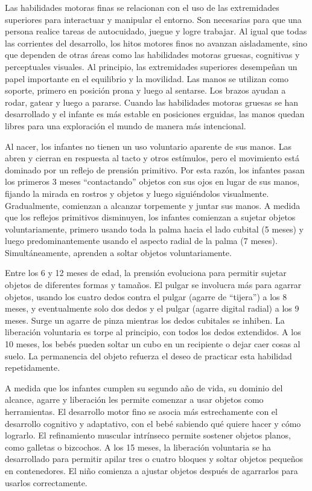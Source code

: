 \documentclass[11pt,letterpaper]{report}
\begin{document}
Las habilidades motoras finas se relacionan con el uso de las extremidades
superiores para interactuar y manipular el entorno. Son necesarias para que una
persona realice tareas de autocuidado, juegue y logre trabajar. Al igual que
todas las corrientes del desarrollo, los hitos motores finos no avanzan
aisladamente, sino que dependen de otras áreas como las habilidades motoras
gruesas, cognitivas y perceptuales visuales. Al principio, las extremidades
superiores desempeñan un papel importante en el equilibrio y la movilidad. Las
manos se utilizan como soporte, primero en posición prona y luego al sentarse.
Los brazos ayudan a rodar, gatear y luego a pararse. Cuando las habilidades
motoras gruesas se han desarrollado y el infante es más estable en posiciones
erguidas, las manos quedan libres para una exploración el mundo de manera más
intencional. \cite{Gerber2010}

Al nacer, los infantes no tienen un uso voluntario aparente de sus manos. Las
abren y cierran en respuesta al tacto y otros estímulos, pero el movimiento
está dominado por un reflejo de prensión primitivo. Por esta razón, los
infantes pasan los primeros 3 meses ``contactando'' objetos con sus ojos en
lugar de sus manos, fijando la mirada en rostros y objetos y luego siguiéndolos
visualmente. Gradualmente, comienzan a alcanzar torpemente y juntar sus manos.
A medida que los reflejos primitivos disminuyen, los infantes comienzan a
sujetar objetos voluntariamente, primero usando toda la palma hacia el lado
cubital (5 meses) y luego predominantemente usando el aspecto radial de la
palma (7 meses). Simultáneamente, aprenden a soltar objetos voluntariamente.
\cite{Gerber2010}

Entre los 6 y 12 meses de edad, la prensión evoluciona para permitir sujetar
objetos de diferentes formas y tamaños. El pulgar se involucra más para agarrar
objetos, usando los cuatro dedos contra el pulgar (agarre de ``tijera'') a los
8 meses, y eventualmente solo dos dedos y el pulgar (agarre digital radial) a
los 9 meses. Surge un agarre de pinza mientras los dedos cubitales se inhiben.
La liberación voluntaria es torpe al principio, con todos los dedos extendidos.
A los 10 meses, los bebés pueden soltar un cubo en un recipiente o dejar caer
cosas al suelo. La permanencia del objeto refuerza el deseo de practicar esta
habilidad repetidamente. \cite{Gerber2010}

A medida que los infantes cumplen su segundo año de vida, su dominio del
alcance, agarre y liberación les permite comenzar a usar objetos como
herramientas. El desarrollo motor fino se asocia más estrechamente con el
desarrollo cognitivo y  adaptativo, con el bebé sabiendo qué quiere hacer y
cómo lograrlo. El refinamiento muscular intrínseco permite sostener objetos
planos, como galletas o bizcochos. A los 15 meses, la liberación voluntaria se
ha desarrollado para permitir apilar tres o cuatro bloques y soltar objetos
pequeños en contenedores. El niño comienza a ajustar objetos después de
agarrarlos para usarlos correctamente. \cite{Gerber2010}
\end{document}
